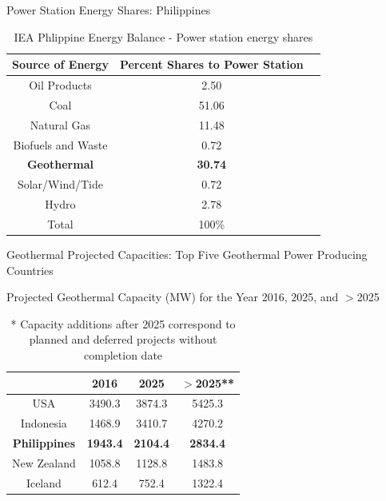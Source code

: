 \begin{frame}{Power Station Energy Shares: Philippines}
   \begin{table}[h]
		\centering
		\caption{ IEA Phlippine Energy Balance - Power station energy shares\cite{IEA2018PhilippineEnergyBalance}}
		\label{tab:phppowerstationenergyshares}
		 \begin{tabular}{ccc}
			 \hline
			 Source of Energy & Percent Shares to Power Station \\
			 \hline
			 Oil Products & 2.50 \\
			 Coal & 51.06 \\
			 Natural Gas & 11.48 \\
		     Biofuels and Waste & 0.72 \\
			 \textbf{Geothermal} & \textbf{30.74} \\
			 Solar/Wind/Tide & 0.72 \\
			 Hydro & 2.78\\
			\hline
			Total & 100\% \\
			\hline
		  \end{tabular}
    \end{table}
\end{frame}

\begin{frame}{Geothermal Projected Capacities: Top Five Geothermal Power Producing Countries \cite{irenageothermalpower2017}}
    \begin{table}[h]
		\centering
		\caption{\centering Projected Geothermal Capacity (MW) for the Year 2016, 2025, and $>$2025}
		\label{tab:projectedgeothermalpower}
		\begin{tabular}{cccc}
			\hline
			 & 2016 & 2025 & $>$2025**\\
			\hline
			USA & 3490.3 & 3874.3 & 5425.3\\
			Indonesia & 1468.9 & 3410.7 & 4270.2\\
			\textbf{Philippines} & \textbf{1943.4} & \textbf{2104.4} & \textbf{2834.4}\\
			New Zealand & 1058.8 & 1128.8 & 1483.8\\
			Iceland& 612.4 & 752.4 & 1322.4\\
			\hline
		\end{tabular}
		\caption{\centering** Capacity additions after 2025 correspond to planned and deferred projects without completion date}
	\end{table}
\end{frame}

